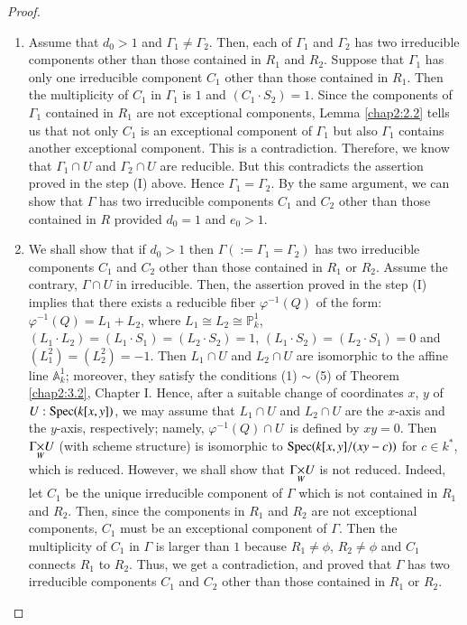 \begin{proof}
\begin{enumerate}
\renewcommand{\theenumi}{\Roman{enumi}}
\renewcommand{\labelenumi}{\rm(\theenumi)}
\setcounter{enumi}{1}
\item Assume that $d_{0}>1$ and $\Gamma_{1}\neq \Gamma_{2}$. Then,
  each of $\Gamma_{1}$ and $\Gamma_{2}$ has two irreducible components
  other than those contained in $R_{1}$ and $R_{2}$. Suppose that
  $\Gamma_{1}$ has only one irreducible component $C_{1}$ other than
  those contained in $R_{1}$. Then the multiplicity of $C_{1}$ in
  $\Gamma_{1}$ is $1$ and $(C_{1}\cdot S_{2})=1$. Since the components
  of $\Gamma_{1}$ contained in $R_{1}$ are not exceptional components,
  Lemma \ref{chap2:2.2} tells us that not only $C_{1}$ is an exceptional
  component of $\Gamma_{1}$ but also $\Gamma_{1}$ contains another
  exceptional component. This is a contradiction. Therefore, we know
  that $\Gamma_{1}\cap U$ and $\Gamma_{2}\cap U$ are reducible. But
  this contradicts the assertion proved in the step (I) above. Hence
  $\Gamma_{1}=\Gamma_{2}$. By the same argument, we can show that
  $\Gamma$ has two irreducible components $C_{1}$ and $C_{2}$ other
  than those contained in $R$ provided $d_{0}=1$ and $e_{0}>1$.

\item We shall show that if $d_{0}>1$ then
  $\Gamma(:=\Gamma_{1}=\Gamma_{2})$ has two irreducible components
  $C_{1}$ and $C_{2}$ other than those contained in $R_{1}$ or
  $R_{2}$. Assume the contrary, \iec $\Gamma\cap U$ in
  irreducible. Then, the assertion proved in the step (I) implies that
  there exists a reducible fiber $\varphi^{-1}(Q)$ of the form:
    $\varphi^{-1}(Q)=L_{1}+L_{2}$, where $L_{1}\cong
    L_{2}\cong\mathbb{P}^{1}_{k}$, $(L_{1}\cdot L_{2})=(L_{1}\cdot
    S_{1})=(L_{2}\cdot S_{2})=1$, $(L_{1}\cdot S_{2})=(L_{2}\cdot
    S_{1})=0$ and $(L^{2}_{1})=(L^{2}_{2})=-1$. Then $L_{1}\cap U$ and
    $L_{2}\cap U$ are isomorphic to the affine line
    $\mathbb{A}^{1}_{k}$; moreover, they satisfy the conditions (1)
    $\sim$ (5) of Theorem \ref{chap2:3.2}, Chapter I. Hence, after a
    suitable change of coordinates $x$, $y$ of $U:\operatorname{Spec}(k[x,y])$, we
    may assume that $L_{1}\cap U$ and $L_{2}\cap U$ are the $x$-axis
    and the $y$-axis, respectively; namely, $\varphi^{-1}(Q)\cap
    U$\pageoriginale\ is defined by $xy=0$. Then $\fprod{\Gamma}{U}{W}$
    (with scheme structure) is isomorphic to $\operatorname{Spec}(k[x,y]/(xy-c))$
    for $c\in k^{\ast}$, which is reduced. However, we shall show that
    $\fprod{\Gamma}{U}{W}$ is not reduced. Indeed, let $C_{1}$ be the
    unique irreducible component of $\Gamma$ which is not contained in
    $R_{1}$ and $R_{2}$. Then, since the components in $R_{1}$ and
    $R_{2}$ are not exceptional components, $C_{1}$ must be an
    exceptional component of $\Gamma$. Then the multiplicity of
    $C_{1}$ in $\Gamma$ is larger than $1$ because $R_{1}\neq \phi$,
    $R_{2}\neq \phi$ and $C_{1}$ connects $R_{1}$ to $R_{2}$. Thus, we
    get a contradiction, and proved that $\Gamma$ has two irreducible
    components $C_{1}$ and $C_{2}$ other than those contained in
    $R_{1}$ or $R_{2}$.


\end{enumerate}
\end{proof}
